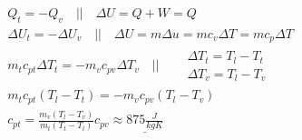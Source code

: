 \documentclass[12pt,a4paper,finnish]{article}
\begin{document}
\begin{align}
 &Q_t = -Q_v \quad\bigg|\bigg|\quad \Delta U = Q + W = Q\\
 &\Delta U_t = -\Delta U_v \quad\bigg|\bigg|\quad \Delta U = m\Delta u = mc_v\Delta T = mc_p\Delta T\\
 &m_tc_{pt}\Delta T_t = -m_vc_{pv}\Delta T_v \quad\bigg|\bigg|\quad
  \begin{aligned}
    &\Delta T_t = T_l - T_t\\
    &\Delta T_v = T_l - T_v
  \end{aligned}\\
 &m_tc_{pt}(T_l - T_t) = -m_vc_{pv}(T_l - T_v)\\
 &c_{pt} = \frac{m_v(T_l - T_v)}{m_t(T_t - T_l)}c_{pv} \approx \underline{875\frac{J}{kgK}}
\end{align}
\end{document}
